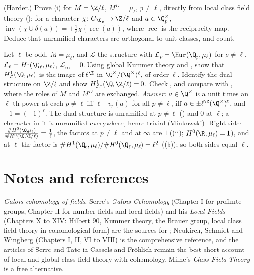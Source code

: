 \begin{exercise}\label{ex:galcoh:ex-cft-orth}
(Harder.) Prove (i) for $M=\Z/\ell$, $M^D=\mu_\ell$, $p\ne\ell$, directly from local class field theory (): for a character
$\chi\colon G_{\Q_p}\to\Z/\ell$ and $a\in\Q_p^\times$, $\operatorname{inv}(\chi\cup\delta(a))=\pm\frac1\ell\chi(\operatorname{rec}(a))$, where $\operatorname{rec}$ is the reciprocity map. Deduce that unramified characters are
orthogonal to unit classes, and count.
\end{exercise}

\begin{exercise}\label{ex:galcoh:ex-gw-mu}
Let $\ell$ be odd, $M=\mu_\ell$, and $\mathcal L$ the structure with $\mathcal L_p=\Hur(\Q_p,\mu_\ell)$ for $p\ne\ell$, $\mathcal L_\ell=H^1(\Q_\ell,\mu_\ell)$, $\mathcal L_\infty=0$. Using global Kummer
theory and , show that $H^1_{\mathcal L}(\Q,\mu_\ell)$ is the image of $\ell^{\Z}$ in $\Q^\times/(\Q^\times)^\ell$, of order $\ell$. Identify the dual structure on
$\Z/\ell$ and show $H^1_{\mathcal L^*}(\Q,\Z/\ell)=0$. Check , and compare with , where the roles of $M$ and $M^D$ are exchanged.
\emph{Answer:} $a\in\Q^\times$ is a unit times an $\ell$-th power at each $p\ne\ell$ iff $\ell\mid v_p(a)$ for all $p\ne\ell$, iff $a\in\pm\ell^{\Z}(\Q^\times)^\ell$, and $-1=(-1)^\ell$. The dual
structure is unramified at $p\ne\ell$ () and $0$ at $\ell$; a character in it is unramified everywhere, hence trivial (Minkowski). Right side:
$\frac{\#H^0(\Q,\mu_\ell)}{\#H^0(\Q,\Z/\ell)}=\frac1\ell$, the factors at $p\ne\ell$ and at $\infty$ are $1$ ((ii); $H^0(\R,\mu_\ell)=1$), and at
$\ell$ the factor is $\#H^1(\Q_\ell,\mu_\ell)/\#H^0(\Q_\ell,\mu_\ell)=\ell^2$ ((b)); so both sides equal $\ell$.
\end{exercise}
\section{Notes and references}\label{sec:galcoh:notes}

\emph{Galois cohomology of fields.} Serre's \emph{Galois Cohomology} \cite{SerreGaloisCoh} (Chapter I for profinite groups, Chapter II for number fields and local fields) and
his \emph{Local Fields} \cite{SerreLocalFields} (Chapters X to XIV: Hilbert 90, Kummer theory, the Brauer group, local class field theory in cohomological form) are the
sources for ; Neukirch, Schmidt and Wingberg \cite{NSW} (Chapters I, II, VI to VIII) is the comprehensive reference, and the articles of Serre and
Tate in Cassels and Fr\"ohlich \cite{CasselsFrohlich} remain the best short account of local and global class field theory with cohomology. Milne's \emph{Class Field
Theory} \cite{MilneCFT} is a free alternative.

